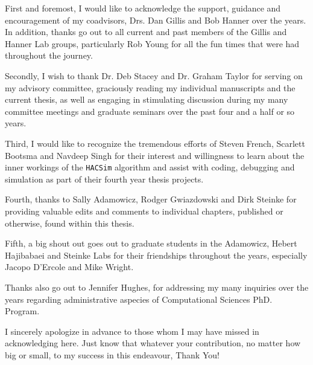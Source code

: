 \begin{acknowledgements}\label{acknow}
\ssp

\noindent First and foremost, I would like to acknowledge the support, guidance and encouragement of my coadvisors, Drs. Dan Gillis and Bob Hanner over the years. In addition, thanks go out to all current and past members of the Gillis and Hanner Lab groups, particularly Rob Young for all the fun times that were had throughout the journey.

\vspace{5mm}

\noindent Secondly, I wish to thank Dr. Deb Stacey and Dr. Graham Taylor for serving on my advisory committee, graciously reading my individual manuscripts and the current thesis, as well as engaging in stimulating discussion during my many committee meetings and graduate seminars over the past four and a half or so years.

\vspace{5mm}

\noindent Third, I would like to recognize the tremendous efforts of Steven French, Scarlett Bootsma and Navdeep Singh for their interest and willingness to learn about the inner workings of the {\tt HACSim} algorithm and assist with coding, debugging and simulation as part of their fourth year thesis projects.

\vspace{5mm}

\noindent Fourth, thanks to Sally Adamowicz, Rodger Gwiazdowski and Dirk Steinke for providing valuable edits and comments to individual chapters, published or otherwise, found within this thesis.

\vspace{5mm}

\noindent Fifth, a big shout out goes out to graduate students in the Adamowicz, Hebert \\ Hajibabaei and Steinke Labs for their friendships throughout the years, especially Jacopo D'Ercole and Mike Wright.

\vspace{5mm}

\noindent Thanks also go out to Jennifer Hughes, for addressing my many inquiries over the years regarding administrative aspecies of Computational Sciences PhD. Program.

\vspace{5mm}

\noindent I sincerely apologize in advance to those whom I may have missed in acknowledging here. Just know that whatever your contribution, no matter how big or small, to my success in this endeavour, Thank You!


\end{acknowledgements}
